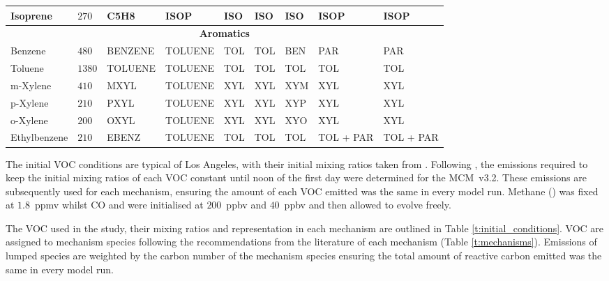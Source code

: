\begin{sidewaystable}
\begin{tabular}{lllllllll}
        Isoprene & $270$ & C5H8 & ISOP & ISO & ISO & ISO & ISOP & ISOP \\ \hline
        \multicolumn{9}{c}{\textbf{Aromatics}} \\ \hline 
        Benzene & $480$ & BENZENE & TOLUENE & TOL & TOL & BEN & PAR & PAR \\
        Toluene & $1380$ & TOLUENE & TOLUENE & TOL & TOL & TOL & TOL & TOL \\
        m-Xylene & $410$ & MXYL & TOLUENE & XYL & XYL & XYM & XYL & XYL \\
        p-Xylene & $210$ & PXYL & TOLUENE & XYL & XYL & XYP & XYL & XYL \\
        o-Xylene & $200$ & OXYL & TOLUENE & XYL & XYL & XYO & XYL & XYL \\
        Ethylbenzene & $210$ & EBENZ & TOLUENE & TOL & TOL & TOL & TOL + PAR & TOL + PAR \\ \hline \hline
    \end{tabular}
    \vspace{1mm}
    \caption{VOC present in Los Angeles, mixing ratios taken from \citet{Baker:2008} and their representation in each chemical mechanism. The representation of the VOC in each mechanism is based upon the recommendations of the literature for each mechanism.}
    \vspace{-4mm}
    \label{t:initial_conditions}
\end{sidewaystable}

The initial VOC conditions are typical of Los Angeles, with their initial mixing ratios taken from \citet{Baker:2008}. 
Following \citet{Butler:2011}, the emissions required to keep the initial mixing ratios of each VOC constant until noon of the first day were determined for the \mbox{MCM v3.2.}
These emissions are subsequently used for each mechanism, ensuring the amount of each VOC emitted was the same in every model run.
Methane () was fixed at \mbox{$1.8$ ppmv} whilst CO and  were initialised at \mbox{$200$ ppbv} and \mbox{$40$ ppbv} and then allowed to evolve freely.

The VOC used in the study, their mixing ratios and representation in each mechanism are outlined in Table \ref{t:initial_conditions}.
VOC are assigned to mechanism species following the recommendations from the literature of each mechanism (Table \ref{t:mechanisms}).
Emissions of lumped species are weighted by the carbon number of the mechanism species ensuring the total amount of reactive carbon emitted was the same in every model run.

